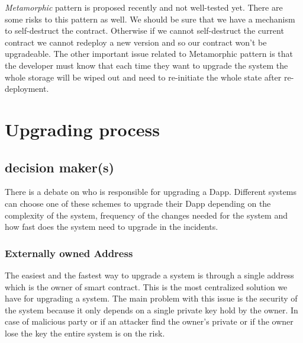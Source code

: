 \textit{Metamorphic} pattern is proposed recently and not well-tested yet. There are some risks to this pattern as well. We should be sure that we have a mechanism to self-destruct the contract. Otherwise if we cannot self-destruct the current contract we cannot redeploy a new version and so our contract won't be upgradeable. The other important issue related to Metamorphic pattern is that the developer must know that each time they want to upgrade the system the whole storage will be wiped out and need to re-initiate the whole state after re-deployment. 


 \section{Upgrading process}
 \subsection{decision maker(s)} \label{decisionMakers}
 There is a debate on who is responsible for upgrading a Dapp. Different systems can choose one of these schemes to upgrade their Dapp depending on the complexity of the system, frequency of the changes needed for the system and how fast does the system need to upgrade in the incidents.


 \subsubsection{Externally owned Address}
The easiest and the fastest way to upgrade a system is through a single address which is the owner of smart contract. This is the most centralized solution we have for upgrading a system. The main problem with this issue is the security of the system because it only depends on a single private key hold by the owner. In case of malicious party or if an attacker find the owner's private or if the owner lose the key the entire system is on the risk.

